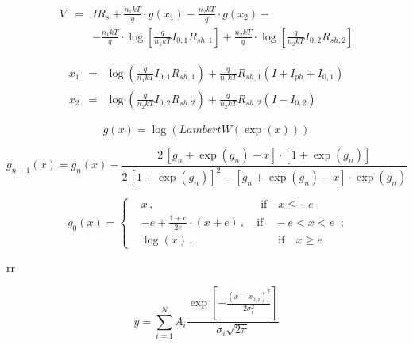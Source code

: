 \documentclass[14pt]{article}
\numberwithin{equation}{part}
\begin{document}
\begin{eqnarray*}
  V &=& IR_s+\frac{n_1kT}{q}\cdot g\left(x_1\right)-\frac{n_2kT}{q}\cdot g\left(x_2\right)- \\
  &&-\frac{n_1kT}{q}\cdot\log\left[\frac{q}{n_1kT}I_{0,1}R_{sh,1}\right]
  +\frac{n_2kT}{q}\cdot\log\left[\frac{q}{n_2kT}I_{0,2}R_{sh,2}\right]
\end{eqnarray*}

\begin{eqnarray*}
  x_1 &=& \log\left(\frac{q}{n_1kT}I_{0,1}R_{sh,1}\right)+\frac{q}{n_1kT}R_{sh,1}\left(I+I_{ph}+I_{0,1}\right) \\
  x_2&=& \log\left(\frac{q}{n_2kT}I_{0,2}R_{sh,2}\right)+\frac{q}{n_2kT}R_{sh,2}\left(I-I_{0,2}\right)
\end{eqnarray*}

\begin{equation*}
  g(x)=\log\left(LambertW\left(\exp(x)\right)\right)
\end{equation*}

\begin{equation*}
  g_{n+1}(x)=g_n(x)-\frac{2\,\left[g_n+\exp\left(g_n\right)-x\right]\cdot\left[1+\exp\left(g_n\right)\right]}
  {2\,\left[1+\exp\left(g_n\right)\right]^2-\left[g_n+\exp\left(g_n\right)-x\right]\cdot\exp\left(g_n\right)}
\end{equation*}

\begin{equation*}
    g_0(x)=
   \left\{
   \begin{aligned}
   &x\,,\;\;\qquad \qquad\qquad\qquad\quad\text{if}\quad x\leqslant-e \\
   &-e+\frac{1+e}{2e}\cdot(x+e)\,,\quad\text{if}\quad -e<x<e \\
    &\log(x)\,,\;\; \quad\qquad\qquad\qquad\text{if}\quad x\geqslant e          
    \end{aligned}
     \right.\,;
\end{equation*}

rr

\begin{equation*}
  y=\sum_{i=1}^{N}A_i\frac{\exp\left[-\frac{\left(x-x_{0,i}\right)^2}{2\sigma_i^2}\right]}{\sigma_i\sqrt{2\pi}}
\end{equation*}
\end{document}
